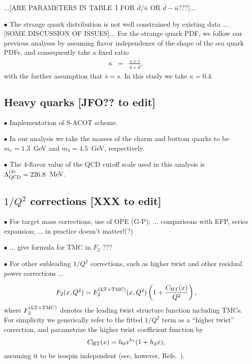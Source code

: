\documentclass[aps,prd,amsmath,preprint]{revtex4}
\begin{document}
{\color{red} ...[ARE PARAMETERS IN TABLE~I FOR $\bar d / \bar u$
OR $\bar d - \bar u$???]...}




$\bullet$
The strange quark distribution is not well constrained by existing
data ...[SOME DISCUSSION OF ISSUES]...
%
For the strange quark PDF, we follow our previous analyses
\cite{CJ11, CJ12} by assuming flavor independence of the shape
of the sea quark PDFs, and consequently take a fixed ratio
%
\begin{eqnarray}
\kappa
&=& \frac{s + \bar s}{\bar u + \bar d},
\label{eq:kappa}
\end{eqnarray}
%
with the further assumption that $\bar s = s$.
In this study we take $\kappa = 0.4$.


\subsection{Heavy quarks {\color{red} [JFO?? to edit]}}
\label{ssec:HQs}

$\bullet$
Implementation of S-ACOT scheme.


$\bullet$
In our analysis we take the masses of the charm and bottom quarks
to be $m_c = 1.3$~GeV and $m_b = 4.5$~GeV, respectively.


$\bullet$
The 4-flavor value of the QCD cutoff scale used in this analysis is
$\Lambda_{\rm QCD}^{(4)} = 226.8$~MeV.


\subsection{$1/Q^2$ corrections {\color{red} [XXX to edit]}}
\label{ssec:power}

$\bullet$
For target mass corrections, use of OPE (G-P);
... comparisons with EFP, series expansion;
... in practice doesn't matter!(?)


$\bullet$
... give formula for TMC in $F_2$ ???


$\bullet$
For other subleading $1/Q^2$ corrections, such as higher twist and
other residual power corrections ...


%
\begin{align}
F_2(x,Q^2)
= F_2^{(\rm LT+TMC)}(x,Q^2)
  \left( 1 + \frac{C_{\rm HT}(x)}{Q^2} \right),
\label{eq:F2ht}
\end{align}
%
where $F_2^{\rm (LT+TMC)}$ denotes the leading twist structure function
including TMCs.  For simplicity we generically refer to the fitted
$1/Q^2$ term as a ``higher twist'' correction, and parametrize the
higher twist coefficient function by
%
\begin{align}
C_{\rm HT}(x) = h_0 x^{h_1} (1+h_2 x),
\label{eq:C_ht}
\end{align}
%
assuming it to be isospin independent
(see, however, Refs.~\cite{Vir92, AKL03, BB08, Blu12}).
\end{document}
